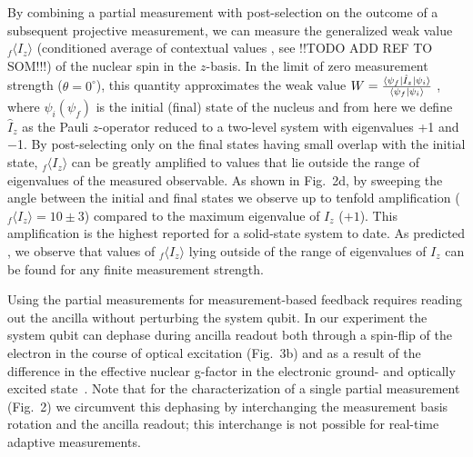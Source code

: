 By combining a partial measurement with post-selection on the outcome of a subsequent projective measurement, we can measure the generalized weak value $_{f} \langle I_{z} \rangle$ (conditioned average of contextual values \cite{Dressel_PRL_2010}, see !!TODO ADD REF TO SOM!!!) of the nuclear spin in the $z$-basis. In the limit of zero measurement strength ($\theta = 0^{\circ}$), this quantity approximates the weak value \cite{Aharonov_PRL_1988} $W = \frac{\langle \psi_f| \hat{I}_z \left|\psi_i\right\rangle}{\langle \psi_f| \psi_i \rangle}$ , where $ \psi_i (\psi_f )$ is the initial (final) state of the nucleus and from here we define $\hat{I}_z$ as the Pauli $z$-operator reduced to a two-level system with eigenvalues +1 and $-$1. By post-selecting only on the final states having small overlap with the initial state, $_{f} \langle I_{z} \rangle$ can be greatly amplified to values that lie outside the range of eigenvalues of the measured observable. As shown in Fig.~2d, by sweeping the angle between the initial and final states we observe up to tenfold amplification ($_{f} \langle I_{z} \rangle = 10 \pm 3$) compared to the maximum eigenvalue of $I_{z}$ ($+1$). This amplification is the highest reported for a solid-state system to date\cite{Groen_PRL_2013}. As predicted \cite{Williams_PRL_2008}, we observe that values of  $_{f} \langle I_{z} \rangle$ lying outside of the range of eigenvalues of $I_{z}$ can be found for any finite measurement strength.

Using the partial measurements for measurement-based feedback requires reading out the ancilla without perturbing the system qubit. In our experiment the system qubit can dephase during ancilla readout both through a spin-flip of the electron in the course of optical excitation (Fig.~3b) and as a result of the difference in the effective nuclear g-factor in the electronic ground- and optically excited state~\cite{Jiang_PRL_2008}. Note that for the characterization of a single partial measurement (Fig.~2) we circumvent this dephasing by interchanging the measurement basis rotation and the ancilla readout; this interchange is not possible for real-time adaptive measurements.

